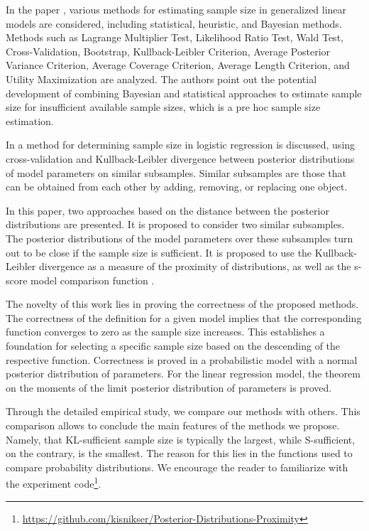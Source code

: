 \documentclass[sn-mathphys-num]{sn-jnl}%
\begin{document}
In the paper \cite{Grabovoy2022}, various methods for estimating sample size in generalized linear models are considered, including statistical, heuristic, and Bayesian methods. Methods such as Lagrange Multiplier Test, Likelihood Ratio Test, Wald Test, Cross-Validation, Bootstrap, Kullback-Leibler Criterion, Average Posterior Variance Criterion, Average Coverage Criterion, Average Length Criterion, and Utility Maximization are analyzed. The authors point out the potential development of combining Bayesian and statistical approaches to estimate sample size for insufficient available sample sizes, which is a pre hoc sample size estimation.

In \cite{MOTRENKO2014743} a method for determining sample size in logistic regression is discussed, using cross-validation and Kullback-Leibler divergence between posterior distributions of model parameters on similar subsamples. Similar subsamples are those that can be obtained from each other by adding, removing, or replacing one object.

In this paper, two approaches based on the distance between the posterior distributions are presented. It is proposed to consider two similar subsamples. The posterior distributions of the model parameters over these subsamples turn out to be close if the sample size is sufficient. It is proposed to use the Kullback-Leibler divergence \cite{MOTRENKO2014743} as a measure of the proximity of distributions, as well as the s-score model comparison function \cite{Aduenko2017}. 

The novelty of this work lies in proving the correctness of the proposed methods. The correctness of the definition for a given model implies that the corresponding function  converges to zero as the sample size increases. This establishes a foundation for selecting a specific sample size based on the descending of the respective function. Correctness is proved in a probabilistic model with a normal posterior distribution of parameters. For the linear regression model, the theorem on the moments of the limit posterior distribution of parameters is proved.

Through the detailed empirical study, we compare our methods with others. This comparison allows to conclude the main features of the methods we propose. Namely, that KL-sufficient sample size is typically the largest, while S-sufficient, on the contrary, is the smallest. The reason for this lies in the functions used to compare probability distributions. We encourage the reader to familiarize with the experiment code\footnote{\href{https://github.com/kisnikser/Posterior-Distributions-Proximity}{https://github.com/kisnikser/Posterior-Distributions-Proximity}}.
\end{document}
